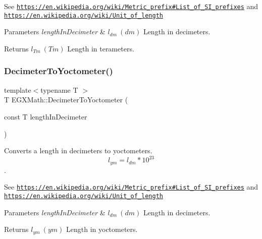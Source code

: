 See \href{https://en.wikipedia.org/wiki/Metric_prefix#List_of_SI_prefixes}{\tt https\+://en.\+wikipedia.\+org/wiki/\+Metric\+\_\+prefix\#\+List\+\_\+of\+\_\+\+S\+I\+\_\+prefixes} and \href{https://en.wikipedia.org/wiki/Unit_of_length}{\tt https\+://en.\+wikipedia.\+org/wiki/\+Unit\+\_\+of\+\_\+length} 
\begin{DoxyParams}{Parameters}
{\em length\+In\+Decimeter} & $ l_{dm}\ (dm)$ Length in decimeters. \\
\hline
\end{DoxyParams}
\begin{DoxyReturn}{Returns}
$ l_{Tm}\ (Tm)$ Length in terameters. 
\end{DoxyReturn}
\mbox{\label{group___e_g_x_math-_conversions-_length_conversions-_decimeter-_s_i_ga9da3b12a8bfe244f7af0cc13cf0de4a8}} 
\subsubsection{\texorpdfstring{Decimeter\+To\+Yoctometer()}{DecimeterToYoctometer()}}
{\footnotesize\ttfamily template$<$typename T $>$ \\
T E\+G\+X\+Math\+::\+Decimeter\+To\+Yoctometer (\begin{DoxyParamCaption}\item[{const T}]{length\+In\+Decimeter }\end{DoxyParamCaption})}



Converts a length in decimeters to yoctometers. \[ l_{ym}=l_{dm} * 10^{23} \]. 

See \href{https://en.wikipedia.org/wiki/Metric_prefix#List_of_SI_prefixes}{\tt https\+://en.\+wikipedia.\+org/wiki/\+Metric\+\_\+prefix\#\+List\+\_\+of\+\_\+\+S\+I\+\_\+prefixes} and \href{https://en.wikipedia.org/wiki/Unit_of_length}{\tt https\+://en.\+wikipedia.\+org/wiki/\+Unit\+\_\+of\+\_\+length} 
\begin{DoxyParams}{Parameters}
{\em length\+In\+Decimeter} & $ l_{dm}\ (dm)$ Length in decimeters. \\
\hline
\end{DoxyParams}
\begin{DoxyReturn}{Returns}
$ l_{ym}\ (ym)$ Length in yoctometers. 
\end{DoxyReturn}
\mbox{\label{group___e_g_x_math-_conversions-_length_conversions-_decimeter-_s_i_ga47bb0274bb352706479e9f103686669b}} 
